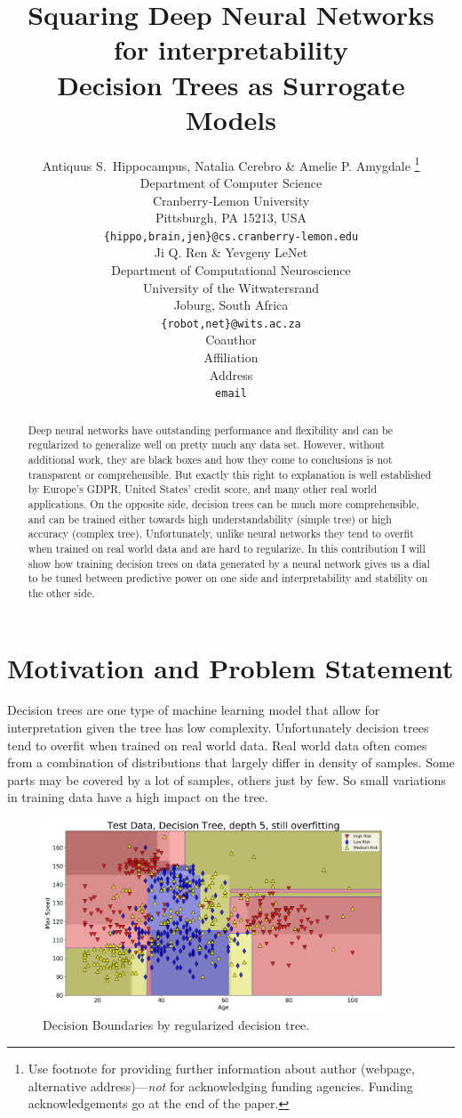 \documentclass{article} %
\title{Squaring Deep Neural Networks for interpretability \\ Decision Trees as Surrogate Models}
\author{Antiquus S.~Hippocampus, Natalia Cerebro \& Amelie P. Amygdale \thanks{ Use footnote for providing further information
about author (webpage, alternative address)---\emph{not} for acknowledging
funding agencies.  Funding acknowledgements go at the end of the paper.} \\
Department of Computer Science\\
Cranberry-Lemon University\\
Pittsburgh, PA 15213, USA \\
\texttt{\{hippo,brain,jen\}@cs.cranberry-lemon.edu} \\
\And
Ji Q. Ren \& Yevgeny LeNet \\
Department of Computational Neuroscience \\
University of the Witwatersrand \\
Joburg, South Africa \\
\texttt{\{robot,net\}@wits.ac.za} \\
\AND
Coauthor \\
Affiliation \\
Address \\
\texttt{email}
}
\begin{document}
\maketitle

\begin{abstract}

Deep neural networks have outstanding performance and flexibility and can be regularized to generalize well on pretty much any data set. 
However, without additional work, they are black boxes and how they come to conclusions is not transparent or comprehensible. But exactly this right to explanation is well established by 
Europe's GDPR, United States' credit score, and
many other real world applications. On the opposite side, decision trees can be much more comprehensible, and can be trained either towards high understandability (simple tree) 
or high accuracy (complex tree). Unfortunately, unlike neural networks they tend to overfit when trained on real world data and are hard to regularize. In this contribution I will show how training decision trees on data generated by a neural network gives us a dial to be tuned between predictive power on one side and interpretability and stability on the other side.

\end{abstract}

\section{Motivation and Problem Statement}

Decision trees are one type of machine learning model that allow for interpretation given the tree has low complexity. Unfortunately decision trees tend to overfit when trained on real world data. Real world data often comes from a combination of distributions that largely differ in density of samples. Some parts may be covered by a lot of samples, others just by few. So small variations in training data have a high impact on the tree. 

\begin{figure}[h]
\begin{center}
\includegraphics[width=4.0in]{dt-reg-all.png}
\end{center}
\caption{Decision Boundaries by regularized decision tree.}
\label{fig:dt_reg_bad}
\end{figure}
\end{document}
